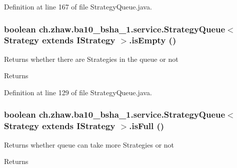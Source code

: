 Definition at line 167 of file StrategyQueue.java.\hypertarget{classch_1_1zhaw_1_1ba10__bsha__1_1_1service_1_1StrategyQueue_3_01Strategy_01extends_01IStrategy_01_4_a13f95814e9acdad7a68586e778d65670}{
\subsubsection[{isEmpty}]{\setlength{\rightskip}{0pt plus 5cm}boolean ch.zhaw.ba10\_\-bsha\_\-1.service.StrategyQueue$<$ Strategy extends {\bf IStrategy} $>$.isEmpty ()}}
\label{classch_1_1zhaw_1_1ba10__bsha__1_1_1service_1_1StrategyQueue_3_01Strategy_01extends_01IStrategy_01_4_a13f95814e9acdad7a68586e778d65670}
Returns whether there are Strategies in the queue or not

\begin{DoxyReturn}{Returns}

\end{DoxyReturn}


Definition at line 129 of file StrategyQueue.java.\hypertarget{classch_1_1zhaw_1_1ba10__bsha__1_1_1service_1_1StrategyQueue_3_01Strategy_01extends_01IStrategy_01_4_a369b0d778468632c08f996c48c55bdb7}{
\subsubsection[{isFull}]{\setlength{\rightskip}{0pt plus 5cm}boolean ch.zhaw.ba10\_\-bsha\_\-1.service.StrategyQueue$<$ Strategy extends {\bf IStrategy} $>$.isFull ()}}
\label{classch_1_1zhaw_1_1ba10__bsha__1_1_1service_1_1StrategyQueue_3_01Strategy_01extends_01IStrategy_01_4_a369b0d778468632c08f996c48c55bdb7}
Returns whether queue can take more Strategies or not

\begin{DoxyReturn}{Returns}

\end{DoxyReturn}


